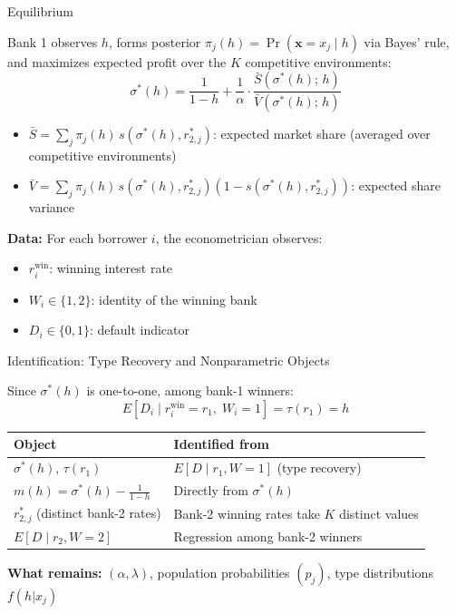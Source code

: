 \documentclass[10pt,aspectratio=169]{beamer}
\begin{document}
\begin{frame}{Equilibrium}

Bank 1 observes $h$, forms posterior $\pi_j(h) = \Pr(\mathbf{x} = x_j \mid h)$ via Bayes' rule, and maximizes expected profit over the $K$ competitive environments:
$$\boxed{\sigma^*(h) = \frac{1}{1-h} + \frac{1}{\alpha} \cdot \frac{\bar{S}(\sigma^*(h);\, h)}{\bar{V}(\sigma^*(h);\, h)}}$$
\begin{itemize}
    \item $\bar{S} = \sum_j \pi_j(h)\, s(\sigma^*(h), r_{2,j}^*)$: expected market share (averaged over competitive environments)
    \item $\bar{V} = \sum_j \pi_j(h)\, s(\sigma^*(h), r_{2,j}^*)(1-s(\sigma^*(h), r_{2,j}^*))$: expected share variance
\end{itemize}

\vspace{0.3cm}
\textbf{Data:} For each borrower $i$, the econometrician observes:
\begin{itemize}
    \item $r_i^{\text{win}}$: winning interest rate
    \item $W_i \in \{1, 2\}$: identity of the winning bank
    \item $D_i \in \{0, 1\}$: default indicator
\end{itemize}
\end{frame}


\begin{frame}{Identification: Type Recovery and Nonparametric Objects}

Since $\sigma^*(h)$ is one-to-one, among bank-1 winners:
$$E[D_i \mid r_i^{\text{win}} = r_1,\; W_i = 1] = \tau(r_1) = h$$

\begin{center}
\renewcommand{\arraystretch}{1.3}
\begin{tabular}{ll}
\toprule
\textbf{Object} & \textbf{Identified from} \\
\midrule
$\sigma^*(h)$, $\tau(r_1)$ & $E[D \mid r_1, W\!=\!1]$ (type recovery) \\
$m(h) = \sigma^*(h) - \frac{1}{1-h}$ & Directly from $\sigma^*(h)$ \\
$r_{2,j}^*$ (distinct bank-2 rates) & Bank-2 winning rates take $K$ distinct values \\
$E[D \mid r_2, W\!=\!2]$ & Regression among bank-2 winners \\
\bottomrule
\end{tabular}
\end{center}

\vspace{0.2cm}
\textbf{What remains:} $(\alpha, \lambda)$, population probabilities $(p_j)$, type distributions $f(h|x_j)$
\end{frame}
\end{document}
